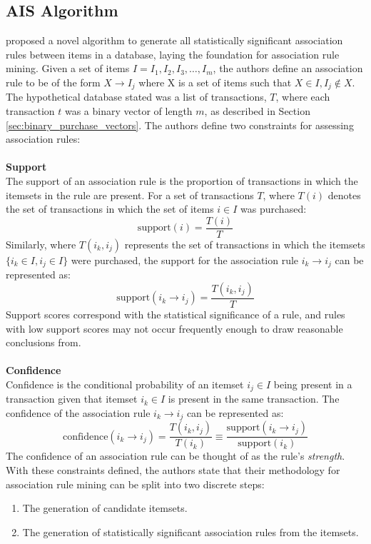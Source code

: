 \subsection{AIS Algorithm}
\label{sec:ais}
 proposed a novel algorithm to generate all statistically significant association rules between items in a database, laying the foundation for association rule mining. Given a set of items $I = I_1, I_2, I_3,\dots,I_m$, the authors define an association rule to be of the form $X \rightarrow I_j$ where X is a set of items such that $X \in I, I_j \notin X$.  The hypothetical database stated was a list of transactions, $T$, where each transaction $t$ was a binary vector of length $m$, as described in Section \ref{sec:binary_purchase_vectors}. The authors define two constraints for assessing association rules:
\\\\\textbf{Support}\\
The support of an association rule is the proportion of transactions in which the itemsets in the rule are present. For a set of transactions $T$, where $T(i)$ denotes the set of transactions in which the set of items $i \in I$ was purchased:
\[
\text{support}(i) = \frac{T(i)}{T} 
\]
Similarly, where $T{(i_k, i_j)}$ represents the set of transactions in which the itemsets $\{i_k \in I, i_j\in I\}$ were purchased, the support for the association rule $i_k \rightarrow i_j$ can be represented as:
\[
\text{support}(i_k \rightarrow i_j) = \frac{T(i_k, i_j)}{T} 
\]
Support scores correspond with the statistical significance of a rule, and rules with low support scores may not occur frequently enough to draw reasonable conclusions from.
\\\\\textbf{Confidence}\\
Confidence is the conditional probability of an itemset $i_j \in I$ being present in a transaction given that itemset $i_k \in I$ is present in the same transaction. The confidence of the association rule $i_k \rightarrow i_j$ can be represented as:
\[
\text{confidence}(i_k \rightarrow i_j) = \frac{T(i_k, i_j)}{T(i_k)} \equiv \frac{\text{support}(i_k \rightarrow i_j)}{\text{support}(i_k)}
\]
The confidence of an association rule can be thought of as the rule's \textit{strength}.
\\With these constraints defined, the authors state that their methodology for association rule mining can be split into two discrete steps:
\begin{enumerate}
\item The generation of candidate itemsets.
\item The generation of statistically significant association rules from the itemsets.
\end{enumerate}
